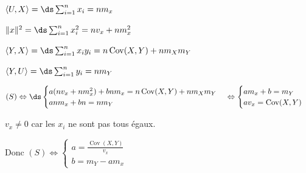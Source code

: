 \begin{exemple}
    $\langle U, X \rangle = \ds \sum_{i = 1}^{n } x_i = n m_x$

    $\| x \|^2 = \ds \sum_{i = 1}^{n } x_i^2 = nv_x + nm_x^2$

    $\langle Y, X \rangle = \ds \sum_{i = 1}^n x_i y_i = n \operatorname{Cov}(X, Y) + nm_X m_Y$

    $\langle Y, U \rangle = \ds \sum_{i = 1}^n y_i = n m_Y$

    $(S) \Leftrightarrow \ds \begin{cases}
a (nv_x + nm_x^2) + b n m_x = n \operatorname{Cov}(X, Y) + nm_X m_Y \\
a n m_x + b n = n m_Y
    \end{cases} \Leftrightarrow \begin{cases}
        am_x + b = m_Y \\
        a v_x = \operatorname{Cov}(X, Y)
    \end{cases}$

    $v_x \neq 0$ car les $x_i$ ne sont pas tous égaux.

    Donc $(S) \Leftrightarrow \begin{cases}
        a = \frac{\operatorname{Cov}(X, Y)}{v_x} \\
        b = m_Y - a m_x
    \end{cases}$
\end{exemple}

